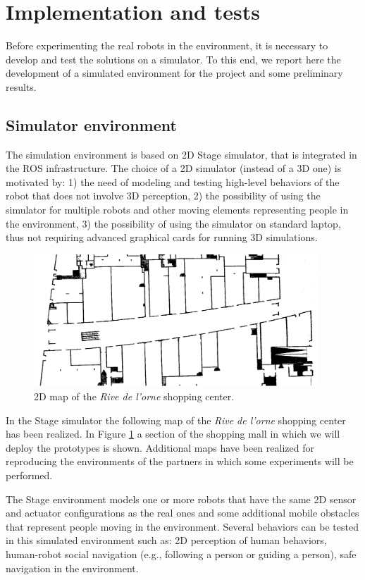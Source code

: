 \section{Implementation and tests}

Before experimenting the real robots in the environment, it is necessary to develop and test the solutions on a simulator. To this end, we report here the development of a simulated environment for the project and some preliminary results.


\subsection{Simulator environment}

The simulation environment is based on 2D Stage simulator, that is integrated in the ROS infrastructure. The choice of a 2D simulator (instead of a 3D one) is motivated by: 1) the need of modeling and testing high-level behaviors of the robot that does not involve 3D perception, 2) the possibility of using the simulator for multiple robots and other moving elements representing people in the environment, 3) the possibility of using the simulator on standard laptop, thus not requiring advanced graphical cards for running 3D simulations.

\begin{figure}
\centering
\includegraphics[width=0.95\textwidth]{fig/Rive1.png}
\caption{2D map of the \emph{Rive de l'orne} shopping center.}
\label{fig:stage}
\end{figure}


In the Stage simulator the following map of the \emph{Rive de l'orne} shopping center has been realized. In Figure \ref{fig:stage} a section of the shopping mall in which we will deploy the prototypes is shown.
Additional maps have been realized for reproducing the environments of the partners in which some experiments will be performed.

The Stage environment models one or more robots that have the same 2D sensor and actuator configurations as the real ones and some additional mobile obstacles that represent people moving in the environment. Several behaviors can be tested in this simulated environment such as: 2D perception of human behaviors, human-robot social navigation (e.g., following a person or guiding a person), safe navigation in the environment.

